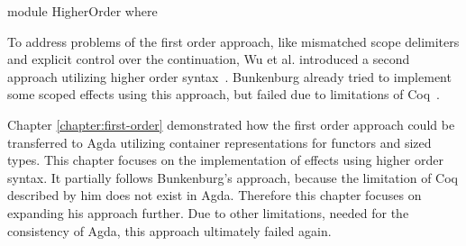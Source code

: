 \begin{code}[hide]
module HigherOrder where
\end{code}


To address problems of the first order approach, like mismatched scope
delimiters and explicit control over the continuation, Wu et al. introduced a
second approach utilizing higher order syntax~\cite{DBLP:conf/haskell/WuSH14}.
Bunkenburg already tried to implement some scoped effects using this approach,
but failed due to limitations of Coq~\cite{bunkenburg2019modeling}.

Chapter \ref{chapter:first-order} demonstrated how the first order approach
could be transferred to Agda utilizing container representations for functors
and sized types.
This chapter focuses on the implementation of effects using higher order syntax.
It partially follows Bunkenburg's approach, because the limitation of Coq
described by him does not exist in Agda.
Therefore this chapter focuses on expanding his approach further.
Due to other limitations, needed for the consistency of Agda, this approach
ultimately failed again.


